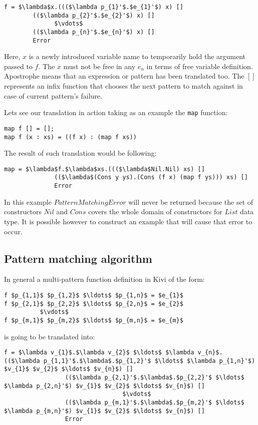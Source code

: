 \documentclass[a4paper]{report}
\begin{document}
\begin{lstlisting}[mathescape=true]
f = $\lambda$x.((($\lambda p_{1}'$.$e_{1}'$) x) []
        (($\lambda p_{2}'$.$e_{2}'$) x) []
              $\vdots$
        (($\lambda p_{n}'$.$e_{n}'$) x) []
        Error
\end{lstlisting}
Here, $x$ is a newly introduced variable name to temporarily hold the argument
passed to $f$. The $x$ must not be free in any $e_{n}$ in terms of free
variable definition. Apostrophe means that an expression or pattern has been
translated too. The $[]$ represents an infix function that chooses the next
pattern to match against in case of current pattern's failure.

Lets see our translation in action taking as an example the \texttt{map}
function:
\begin{lstlisting}
map f [] = [];
map f (x : xs) = ((f x) : (map f xs))
\end{lstlisting}
The result of such translation would be following:
\begin{lstlisting}[mathescape=true]
map = $\lambda$f.$\lambda$xs.((($\lambda$Nil.Nil) xs) []
              (($\lambda$(Cons y ys).(Cons (f x) (map f ys))) xs) []
              Error
\end{lstlisting}
In this example $PatternMatchingError$ will never be returned because the set
of constructors $Nil$ and $Cons$ covers the whole domain of constructors for
$List$ data type. It is possible however to construct an example that will cause
that error to occur.

\subsection{Pattern matching algorithm}
\label{sec:pattern_matching_algorithm}

In general a multi-pattern function definition in Kivi of the form:
\begin{lstlisting}[mathescape=true]
f $p_{1,1}$ $p_{1,2}$ $\ldots$ $p_{1,n}$ = $e_{1}$
f $p_{2,1}$ $p_{2,2}$ $\ldots$ $p_{2,n}$ = $e_{2}$
          $\vdots$
f $p_{m,1}$ $p_{m,2}$ $\ldots$ $p_{m,n}$ = $e_{m}$
\end{lstlisting}
is going to be translated into:
\begin{lstlisting}[mathescape=true]
f = $\lambda v_{1}$.$\lambda v_{2}$ $\ldots$ $\lambda v_{n}$.(($\lambda p_{1,1}'$.$\lambda$.$p_{1,2}'$ $\ldots$ $\lambda p_{1,n}'$) $v_{1}$ $v_{2}$ $\ldots$ $v_{n}$) []
                 (($\lambda p_{2,1}'$.$\lambda$.$p_{2,2}'$ $\ldots$ $\lambda p_{2,n}'$) $v_{1}$ $v_{2}$ $\ldots$ $v_{n}$) []
                                 $\vdots$
                 (($\lambda p_{m,1}'$.$\lambda$.$p_{m,2}'$ $\ldots$ $\lambda p_{m,n}'$) $v_{1}$ $v_{2}$ $\ldots$ $v_{n}$) []
                 Error
\end{lstlisting}
\end{document}
